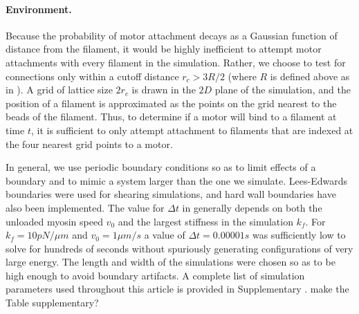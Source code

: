 \documentclass[11pt]{article}
\begin{document}
\paragraph{{\bf Environment.}} Because the probability of motor attachment decays as a Gaussian function of distance from the filament, it would be highly inefficient to attempt motor attachments with every filament in the simulation.  Rather, we choose to test for connections only within a cutoff distance
$r_c>3R/2$ (where $R$ is defined above as in ). A grid of lattice size $2r_c$ is drawn in the $2D$ plane of the simulation, and the position of a filament is approximated as the points on the grid nearest to the beads of the filament. Thus, to determine if a motor will bind to a filament at time $t$, it is sufficient to only attempt attachment to filaments that are indexed at the four nearest grid points to a motor. 
\par
In general, we use periodic boundary conditions so as to limit effects of a boundary and to mimic a system larger than the one we simulate. Lees-Edwards boundaries \cite{allen} were used for shearing simulations, and hard wall boundaries have also been implemented.
The value for $\Delta t$ in  generally depends on both the unloaded myosin speed
$v_0$ and the largest stiffness in the simulation $k_f$. For $k_f = 10pN/\mu m$ and $v_0=1\mu m/s$ a value of $\Delta t = 0.00001 s$ was sufficiently low to solve  for hundreds of seconds without spuriously generating configurations of very large energy.
The length and width of the simulations were chosen so as to be high enough to avoid boundary artifacts. 
A complete list of simulation parameters used throughout this article is provided in {\color{red}Supplementary} . {\color{blue}make the Table supplementary?}
\end{document}
